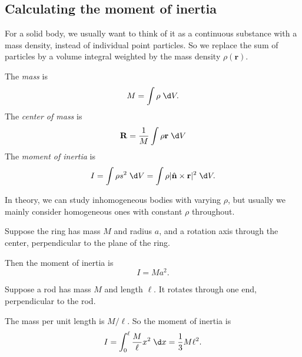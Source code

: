 \documentclass[a4paper]{article}
\begin{document}
\subsection{Calculating the moment of inertia}
For a solid body, we usually want to think of it as a continuous substance with a mass density, instead of individual point particles. So we replace the sum of particles by a volume integral weighted by the mass density $\rho(\mathbf{r})$.

\begin{defi}
  The \emph{mass} is
  \[
    M = \int \rho \;\d V.
  \]
  The \emph{center of mass} is
  \[
    \mathbf{R} = \frac{1}{M}\int \rho \mathbf{r}\;\d V
  \]
  The \emph{moment of inertia} is
  \[
    I = \int \rho s^2 \;\d V = \int \rho|\hat{\mathbf{n}}\times \mathbf{r}|^2\;\d V.
  \]
\end{defi}
In theory, we can study inhomogeneous bodies with varying $\rho$, but usually we mainly consider homogeneous ones with constant $\rho$ throughout.

\begin{eg}
  Suppose the ring has mass $M$ and radius $a$, and a rotation axis through the center, perpendicular to the plane of the ring.
  \begin{center}
  \end{center}
  Then the moment of inertia is
  \[
    I = Ma^2.
  \]
\end{eg}

\begin{eg}
  Suppose a rod has mass $M$ and length $\ell$. It rotates through one end, perpendicular to the rod.
  \begin{center}
  \end{center}
  The mass per unit length is $M/\ell$. So the moment of inertia is
  \[
    I = \int_0 ^\ell \frac{M}{\ell}x^2\;\d x = \frac{1}{3}M\ell^2.
  \]
\end{eg}
\end{document}
